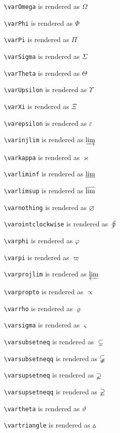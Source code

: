 \texttt{\textbackslash varOmega} is rendered as $\varOmega$

\texttt{\textbackslash varPhi} is rendered as $\varPhi$

\texttt{\textbackslash varPi} is rendered as $\varPi$

\texttt{\textbackslash varSigma} is rendered as $\varSigma$

\texttt{\textbackslash varTheta} is rendered as $\varTheta$

\texttt{\textbackslash varUpsilon} is rendered as $\varUpsilon$

\texttt{\textbackslash varXi} is rendered as $\varXi$

\texttt{\textbackslash varepsilon} is rendered as $\varepsilon$

\texttt{\textbackslash varinjlim} is rendered as $\varinjlim$

\texttt{\textbackslash varkappa} is rendered as $\varkappa$

\texttt{\textbackslash varliminf} is rendered as $\varliminf$

\texttt{\textbackslash varlimsup} is rendered as $\varlimsup$

\texttt{\textbackslash varnothing} is rendered as $\varnothing$

\texttt{\textbackslash varointclockwise} is rendered as $\varointclockwise$

\texttt{\textbackslash varphi} is rendered as $\varphi$

\texttt{\textbackslash varpi} is rendered as $\varpi$

\texttt{\textbackslash varprojlim} is rendered as $\varprojlim$

\texttt{\textbackslash varpropto} is rendered as $\varpropto$

\texttt{\textbackslash varrho} is rendered as $\varrho$

\texttt{\textbackslash varsigma} is rendered as $\varsigma$

\texttt{\textbackslash varsubsetneq} is rendered as $\varsubsetneq$

\texttt{\textbackslash varsubsetneqq} is rendered as $\varsubsetneqq$

\texttt{\textbackslash varsupsetneq} is rendered as $\varsupsetneq$

\texttt{\textbackslash varsupsetneqq} is rendered as $\varsupsetneqq$

\texttt{\textbackslash vartheta} is rendered as $\vartheta$

\texttt{\textbackslash vartriangle} is rendered as $\vartriangle$

